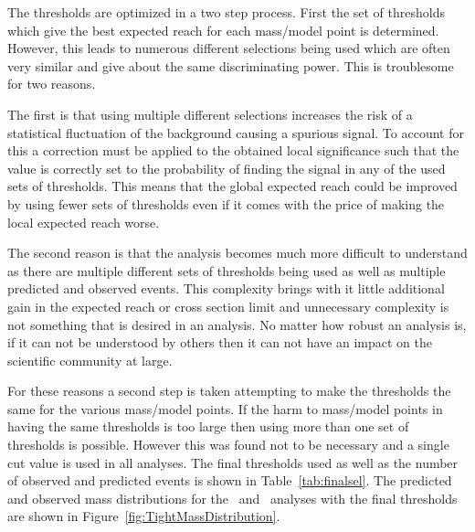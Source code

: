 
The thresholds are optimized in a two step process. First the set of thresholds which give the best expected reach for each mass/model point is determined. However, this leads
to numerous different selections being used which are often very similar and give about the same discriminating power. This is troublesome for two reasons. 

The first is that using multiple different selections increases the risk of a statistical fluctuation of the background causing a spurious signal. 
To account for this a correction
must be applied to the obtained local significance such that the value is correctly set to the probability of finding the signal in any of the used sets of thresholds. This
means that the global expected reach could be improved by using fewer sets of thresholds even if it comes with the price of making the local expected reach worse.

The second reason is that the analysis becomes much more difficult to understand as there are multiple different sets of thresholds being used as well as multiple predicted and 
observed events. This complexity brings with it little additional gain in the expected reach or cross section limit and unnecessary complexity is not something that
is desired in an analysis. No matter how robust an analysis is, if it can not be 
understood by others then it can not have an impact on the scientific community at large.

For these reasons a second step is taken attempting to make the thresholds the same for the various mass/model points. If the harm to mass/model points in having the
same thresholds is too large then using more than one set of thresholds is possible. 
However this was found not to be necessary and a single cut value is used in all analyses. 
The final thresholds used as well as the number of
observed and predicted events is shown in Table~\ref{tab:finalsel}. The predicted and observed mass distributions for the \tkonly\ and \tktof\ analyses
with the final thresholds are shown in Figure~\ref{fig:TightMassDistribution}.

